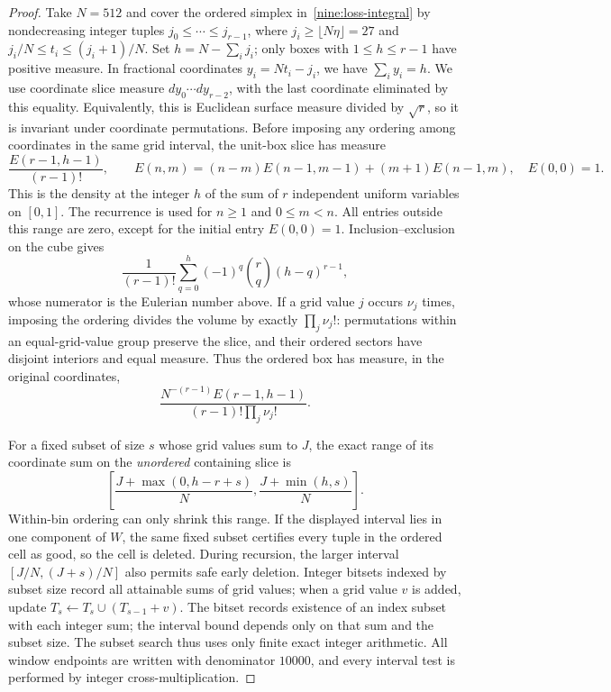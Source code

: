 \documentclass[11pt,a4paper]{article}
\theoremstyle{paperplain}
\numberwithin{equation}{section}
\begin{document}
\begin{proof}
Take $N=512$ and cover the ordered simplex in~\eqref{nine:loss-integral} by
nondecreasing integer tuples $j_0\le\cdots\le j_{r-1}$, where
$j_i\ge\lfloor N\eta\rfloor=27$ and $j_i/N\le t_i\le(j_i+1)/N$.
Set $h=N-\sum_i j_i$; only boxes with $1\le h\le r-1$ have positive measure.
In fractional coordinates $y_i=Nt_i-j_i$, we have $\sum_i y_i=h$.
We use coordinate slice measure $dy_0\cdots dy_{r-2}$, with the last
coordinate eliminated by this equality. Equivalently, this is Euclidean
surface measure divided by $\sqrt r$, so it is invariant under coordinate
permutations.
Before imposing any ordering among coordinates in the same grid interval,
the unit-box slice has measure
\begin{equation}\label{nine:eulerian-volume}
 \frac{E(r-1,h-1)}{(r-1)!},\qquad
 E(n,m)=(n-m)E(n-1,m-1)+(m+1)E(n-1,m),\quad E(0,0)=1.
\end{equation}
This is the density at the integer $h$ of the sum of $r$ independent uniform
variables on $[0,1]$.
The recurrence is used for $n\ge1$ and $0\le m<n$.
All entries outside this range are zero, except for the initial entry
$E(0,0)=1$.
Inclusion--exclusion on the cube gives
\[
 \frac1{(r-1)!}\sum_{q=0}^{h}(-1)^q\binom rq(h-q)^{r-1},
\]
whose numerator is the Eulerian number above.
If a grid value $j$ occurs $\nu_j$ times, imposing the ordering divides the
volume by exactly $\prod_j\nu_j!$: permutations within an equal-grid-value
group preserve the slice, and their ordered sectors have disjoint interiors
and equal measure.
Thus the ordered box has measure, in the original coordinates,
\begin{equation}\label{nine:ordered-volume}
 \frac{N^{-(r-1)}E(r-1,h-1)}{(r-1)!\prod_j\nu_j!}.
\end{equation}

For a fixed subset of size $s$ whose grid values sum to $J$, the exact range
of its coordinate sum on the \emph{unordered} containing slice is
\begin{equation}\label{nine:subset-range}
 \left[\frac{J+\max(0,h-r+s)}N,
       \frac{J+\min(h,s)}N\right].
\end{equation}
Within-bin ordering can only shrink this range.
If the displayed interval lies in one component of $W$, the same fixed
subset certifies every tuple in the ordered cell as good, so the cell is deleted.
During recursion, the larger interval $[J/N,(J+s)/N]$ also permits safe early
deletion.
Integer bitsets indexed by subset size record all attainable sums of grid
values; when a grid value $v$ is added, update
$T_s\gets T_s\cup(T_{s-1}+v)$.
The bitset records existence of an index subset with each integer sum;
the interval bound depends only on that sum and the subset size.
The subset search thus uses only finite exact integer arithmetic.
All window endpoints are written with denominator $10000$, and every interval
test is performed by integer cross-multiplication.


\end{proof}
\end{document}
